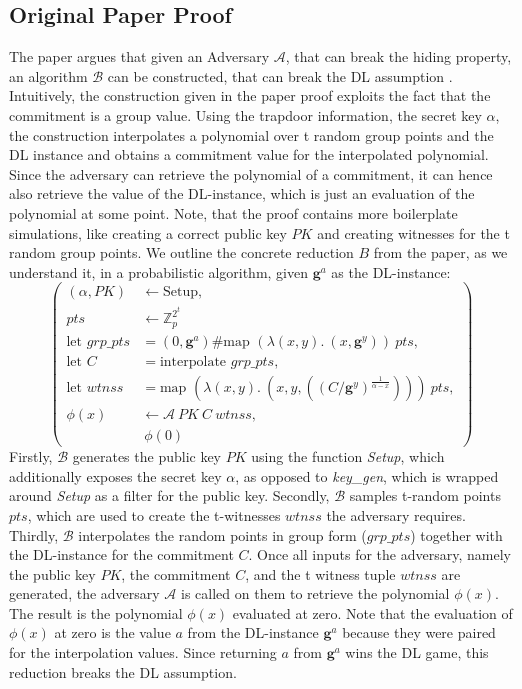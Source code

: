 \subsection*{Original Paper Proof}
The paper argues that given an Adversary $\mathcal{A}$, that can break the hiding property, an algorithm $\mathcal{B}$ can be constructed, that can break the DL assumption \parencite{KZG}. Intuitively, the construction given in the paper proof exploits the fact that the commitment is a group value. Using the trapdoor information, the secret key $\alpha$, the construction interpolates a polynomial over t random group points and the DL instance and obtains a commitment value for the interpolated polynomial. Since the adversary can retrieve the polynomial of a commitment, it can hence also retrieve the value of the DL-instance, which is just an evaluation of the polynomial at some point. Note, that the proof contains more boilerplate simulations, like creating a correct public key $PK$ and creating witnesses for the t random group points. We outline the concrete reduction $B$ from the paper, as we understand it, in a probabilistic algorithm, given $\mathbf{g}^a$ as the DL-instance:
\begin{equation*}
    \left(
        \begin{aligned}
            (\alpha,PK) & \leftarrow \text{Setup}, \\
            pts & \leftarrow \mathbb{Z}_p^{2^t}\\
            \text{let } grp\_pts &= (0,\mathbf{g}^a)\#\text{map } (\lambda (x,y).\ (x,\mathbf{g}^y))\ pts,\\
            \text{let } C &= \text{interpolate } grp\_pts,\\ 
            \text{let } wtnss &= \text{map } (\lambda (x,y).\ (x,y, ((C/\mathbf{g}^y)^{\frac{1}{\alpha-x}})))\ pts,\\
            \phi(x) & \leftarrow \mathcal{A}\ PK \ C\ wtnss, \\
            & \ \phi(0)
        \end{aligned}
    \right)
\end{equation*}
Firstly, $\mathcal{B}$ generates the public key $PK$ using the function \textit{Setup}, which additionally exposes the secret key $\alpha$, as opposed to \textit{key\_gen}, which is wrapped around \textit{Setup} as a filter for the public key. Secondly, $\mathcal{B}$ samples t-random points $pts$, which are used to create the t-witnesses $wtnss$ the adversary requires. Thirdly, $\mathcal{B}$ interpolates the random points in group form ($grp\_pts$) together with the DL-instance for the commitment $C$. Once all inputs for the adversary, namely the public key $PK$, the commitment $C$, and the t witness tuple $wtnss$ are generated, the adversary $\mathcal{A}$ is called on them to retrieve the polynomial $\phi(x)$. The result is the polynomial $\phi(x)$ evaluated at zero. Note that the evaluation of $\phi(x)$ at zero is the value $a$ from the DL-instance $\mathbf{g}^a$ because they were paired for the interpolation values. Since returning $a$ from $\mathbf{g}^a$ wins the DL game, this reduction breaks the DL assumption.

